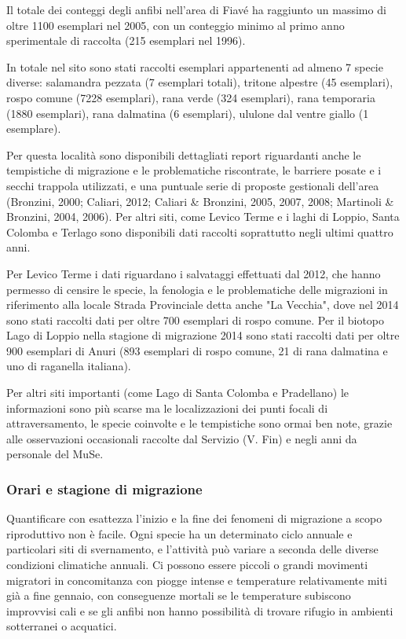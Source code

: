 \documentclass[11pt,a4paper,twoside]{memoir}
\begin{document}
Il totale dei conteggi degli anfibi nell'area di Fiavé ha raggiunto un massimo di oltre 1100 esemplari nel 2005, con un conteggio minimo al primo anno sperimentale di raccolta (215 esemplari nel 1996).

In totale nel sito sono stati raccolti esemplari appartenenti ad almeno 7 specie diverse: salamandra pezzata (7 esemplari totali), tritone alpestre (45 esemplari), rospo comune (7228 esemplari), rana verde (324 esemplari), rana temporaria (1880 esemplari), rana dalmatina (6 esemplari), ululone dal ventre giallo (1 esemplare).


Per questa località sono disponibili dettagliati report riguardanti anche le tempistiche di migrazione e le problematiche riscontrate, le barriere posate e i secchi trappola utilizzati, e una puntuale serie di proposte gestionali dell'area (Bronzini, 2000; Caliari, 2012; Caliari \& Bronzini, 2005, 2007, 2008; Martinoli \& Bronzini, 2004, 2006).
Per altri siti, come Levico Terme e i laghi di Loppio, Santa Colomba e Terlago sono disponibili dati raccolti soprattutto negli ultimi quattro anni.

Per Levico Terme i dati riguardano i salvataggi effettuati dal 2012, che hanno permesso di censire le specie, la fenologia e le problematiche delle migrazioni in riferimento alla locale Strada Provinciale detta anche "La Vecchia", dove nel 2014 sono stati raccolti dati per oltre 700 esemplari di rospo comune.
Per il biotopo Lago di Loppio nella stagione di migrazione 2014 sono stati raccolti dati per oltre 900  esemplari di Anuri (893 esemplari di rospo comune, 21 di rana dalmatina e uno di raganella italiana).

Per altri siti importanti (come Lago di Santa Colomba e Pradellano) le informazioni sono più scarse ma le localizzazioni dei punti focali di attraversamento, le specie coinvolte e le tempistiche sono ormai ben note, grazie alle osservazioni occasionali raccolte dal Servizio (V. Fin) e negli anni da personale del MuSe.


\subsubsection{Orari e stagione di migrazione}
\label{subsubsec:statoanal_fenomig_sintesi_orari}
Quantificare con esattezza l'inizio e la fine dei fenomeni di migrazione a scopo riproduttivo non è facile. Ogni specie ha un determinato ciclo annuale e particolari siti di svernamento, e l’attività può variare a seconda delle diverse condizioni climatiche annuali. Ci possono essere piccoli o grandi movimenti migratori in concomitanza con piogge intense e temperature relativamente miti già a fine gennaio, con conseguenze mortali se le temperature subiscono improvvisi cali e se gli anfibi non hanno possibilità di trovare rifugio in ambienti sotterranei o acquatici.
\end{document}
